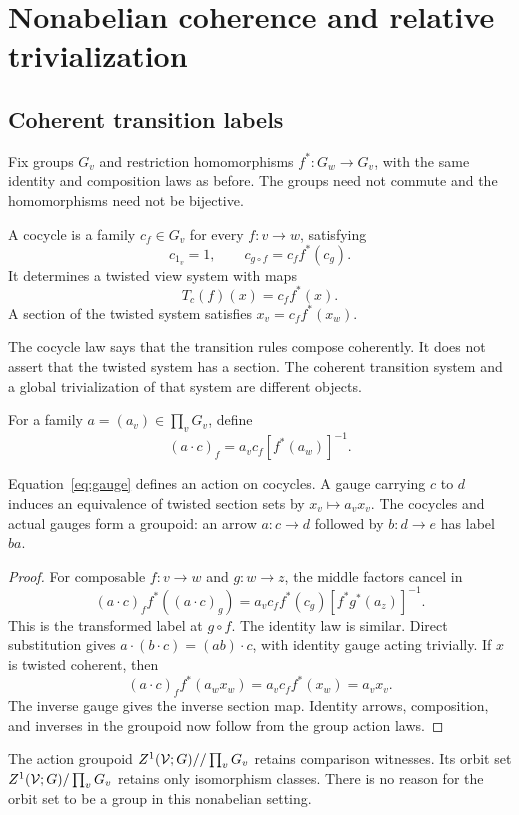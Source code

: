 \section{Nonabelian coherence and relative trivialization}\label{sec:gauge}
\subsection{Coherent transition labels}
Fix groups \(G_v\) and restriction homomorphisms \(f^*:G_w\to G_v\), with the same identity and composition laws as before. The groups need not commute and the homomorphisms need not be bijective.

\begin{definition}[Cocycle]
A cocycle is a family \(c_f\in G_v\) for every \(f:v\to w\), satisfying
\[
 c_{1_v}=1,\qquad c_{g\circ f}=c_f f^*(c_g).
\]
It determines a twisted view system with maps
\[
 T_c(f)(x)=c_f f^*(x).
\]
A section of the twisted system satisfies \(x_v=c_f f^*(x_w)\).
\end{definition}
The cocycle law says that the transition rules compose coherently. It does not assert that the twisted system has a section. The coherent transition system and a global trivialization of that system are different objects.

For a family \(a=(a_v)\in\prod_vG_v\), define
\begin{equation}\label{eq:gauge}
 (a\cdot c)_f=a_vc_f[f^*(a_w)]^{-1}.
\end{equation}

\begin{proposition}\label{KS30}
Equation~\eqref{eq:gauge} defines an action on cocycles. A gauge carrying \(c\) to \(d\) induces an equivalence of twisted section sets by \(x_v\mapsto a_vx_v\). The cocycles and actual gauges form a groupoid: an arrow \(a:c\to d\) followed by \(b:d\to e\) has label \(ba\).
\end{proposition}
\begin{proof}
For composable \(f:v\to w\) and \(g:w\to z\), the middle factors cancel in
\[
 (a\cdot c)_f f^*((a\cdot c)_g)
 =a_vc_f f^*(c_g)[f^*g^*(a_z)]^{-1}.
\]
This is the transformed label at \(g\circ f\). The identity law is similar. Direct substitution gives \(a\cdot(b\cdot c)=(ab)\cdot c\), with identity gauge acting trivially. If \(x\) is twisted coherent, then
\[
 (a\cdot c)_f f^*(a_wx_w)=a_vc_f f^*(x_w)=a_vx_v.
\]
The inverse gauge gives the inverse section map. Identity arrows, composition, and inverses in the groupoid now follow from the group action laws.
\end{proof}
The action groupoid \(Z^1(\mathcal V;G)//\prod_vG_v\) retains comparison witnesses. Its orbit set \(Z^1(\mathcal V;G)/\prod_vG_v\) retains only isomorphism classes. There is no reason for the orbit set to be a group in this nonabelian setting.

